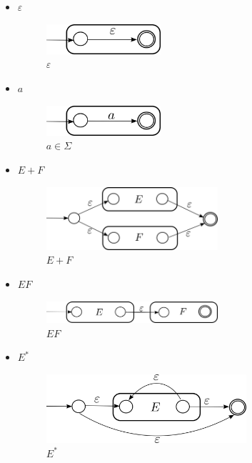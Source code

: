 \documentclass[12pt]{article}
\def\ve{\varepsilon}
\begin{document}
\begin{description}
\begin{itemize}
\item $\ve$
\begin{figure}[H]
    \centering
    \includegraphics[width=0.4\textwidth]{ERtoAFNeVarep}
    \caption{$\ve$}
    \label{fig:ERtoAFNeVarep}
\end{figure}

\item $a$
\begin{figure}[H]
    \centering
    \includegraphics[width=0.4\textwidth]{ERtoAFNea}
    \caption{$a\in \Sigma$}
    \label{fig:ERtoAFNea}
\end{figure}

\item $E+F$
\begin{figure}[H]
    \centering
    \includegraphics[width=0.6\textwidth]{ERtoAFNeE+F}
    \caption{$E+F$}
    \label{fig:ERtoAFNeE+F}
\end{figure}


\break

\item $EF$
\begin{figure}[H]
    \centering
    \includegraphics[width=0.6\textwidth]{ERtoAFNeEF}
    \caption{$EF$}
    \label{fig:ERtoAFNeEF}
\end{figure}

\item $E^*$
\begin{figure}[H]
    \centering
    \includegraphics[width=0.7\textwidth]{ERtoAFNeEKle}
    \caption{$E^*$}
    \label{fig:ERtoAFNeEKle}
\end{figure}


\end{itemize}


\end{description}
\end{document}
